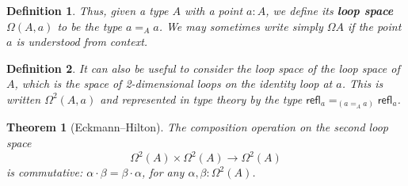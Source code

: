 \documentclass[11pt, a4paper]{article}
\newtheorem{definition}{Definition}
\newtheorem{thm}{Theorem}
\newcommand{\refl}[1]{\ensuremath{\mathsf{refl}_{#1}}\xspace}
\newcommand{\define}[1]{\textbf{#1}}
\newcommand{\id}[3][]{\ensuremath{#2 =_{#1} #3}\xspace}
\begin{document}
\begin{definition}

Thus, given a type $A$ with a point $a:A$, we define its \define{loop space}
%
$\Omega(A,a)$ to be the type $\id[A]{a}{a}$.
We may sometimes write simply $\Omega A$ if the point $a$ is understood from context.

\end {definition}


\begin{definition}
It can also be useful to consider the loop space \emph{of} the loop space of $A$, which is the space of 2-dimensional loops on the identity loop at $a$.
This is written $\Omega^2(A,a)$ and represented in type theory by the type $\id[({\id[A]{a}{a}})]{\refl{a}}{\refl{a}}$.
\end {definition}

\begin{thm}[Eckmann--Hilton]%
  The composition operation on the second loop space
  \begin{equation*}
    \Omega^2(A)\times \Omega^2(A)\to \Omega^2(A)
  \end{equation*}
  is commutative: $\alpha\cdot\beta = \beta\cdot\alpha$, for any $\alpha, \beta:\Omega^2(A)$.
\end{thm}
\end{document}

